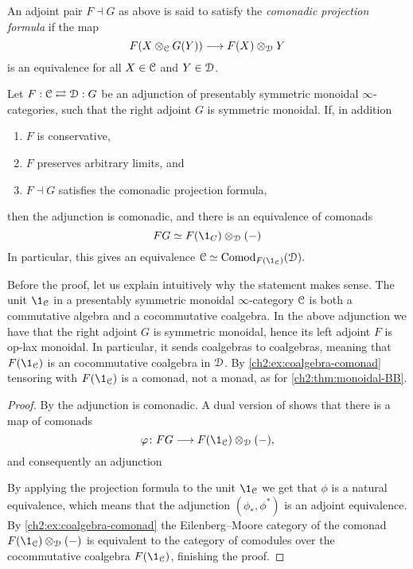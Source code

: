 \begin{definition}
    An adjoint pair $F\dashv G$ as above is said to satisfy the \emph{comonadic projection formula} if the map 
    \[F(X\otimes_{\EuScript{C}} G(Y)) \longrightarrow F(X)\otimes_{\EuScript{D}} Y\]
    is an equivalence for all $X\in \EuScript{C}$ and $Y\in \EuScript{D}$. 
\end{definition}

\begin{theorem}
    \label{ch2:thm:dual-monoidal-BB}
    Let $F:\EuScript{C}\rightleftarrows \EuScript{D}:G$ be an adjunction of presentably symmetric monoidal $\infty$-categories, such that the right adjoint $G$ is symmetric monoidal. If, in addition
    \begin{enumerate}
        \item $F$ is conservative,
        \item $F$ preserves arbitrary limits, and
        \item $F\dashv G$ satisfies the comonadic projection formula,
    \end{enumerate}
    then the adjunction is comonadic, and there is an equivalence of comonads 
    \[FG\simeq F(\1_C)\otimes_\D (-)\] 
    In particular, this gives an equivalence $\C\simeq \Comod_{F(\1_\C)}(\D).$
\end{theorem}

\begin{remark}
    Before the proof, let us explain intuitively why the statement makes sense. The unit $\1_\C$ in a presentably symmetric monoidal $\infty$-category $\EuScript{C}$ is both a commutative algebra and a cocommutative coalgebra. In the above adjunction we have that the right adjoint $G$ is symmetric monoidal, hence its left adjoint $F$ is op-lax monoidal. In particular, it sends coalgebras to coalgebras, meaning that $F(\1_\C)$ is an cocommutative coalgebra in $\EuScript{D}$. By \cref{ch2:ex:coalgebra-comonad} tensoring with $F(\1_\C)$ is a comonad, not a monad, as for \cref{ch2:thm:monoidal-BB}. 
\end{remark}

\begin{proof}
    By \cite[4.5]{brantner-mathew_2023} the adjunction is comonadic. A dual version of \cite[3.6]{elmanto-kolderup_2020} shows that there is a map of comonads 
    \[\phi\: FG \to F(\1_\C)\otimes_\D (-),\] 
    and consequently an adjunction 
    \begin{center}
    \end{center}
    By applying the projection formula to the unit $\1_\C$ we get that $\phi$ is a natural equivalence, which means that the adjunction $(\phi_*, \phi^*)$ is an adjoint equivalence. By \cref{ch2:ex:coalgebra-comonad} the Eilenberg--Moore category of the comonad $F(\1_\C)\otimes_\D (-)$ is equivalent to the category of comodules over the cocommutative coalgebra $F(\1_\C)$, finishing the proof. 
\end{proof}

